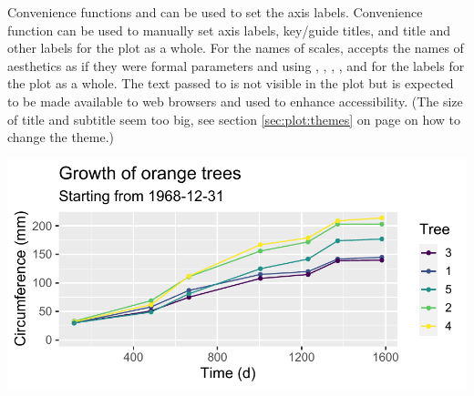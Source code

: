 \documentclass[krantz2]{krantz}\usepackage{knitr}
\begin{document}
Convenience functions  and  can be used to set the axis labels.
Convenience function  can be used to manually set axis labels, key/guide titles, and title and other labels for the plot as a whole. For the names of scales,  accepts the names of aesthetics as if they were formal parameters and using , , , , and  for the labels for the plot as a whole. The text passed to  is not visible in the plot but is expected to be made available to web browsers and used to enhance accessibility. (The size of title and subtitle seem too big, see section \ref{sec:plot:themes} on page \pageref{sec:plot:themes} on how to change the theme.)

\begin{knitrout}\footnotesize
{}\color{fgcolor}\begin{kframe}
\begin{alltt}
 \hlkwb{<-}
  \hlstd{(} 
          \hlstd{=} \hlstd{(}      \hlopt{+}
  \hlstd{()} \hlopt{+}
  \hlstd{()}
\end{alltt}
\end{kframe}
\end{knitrout}

\begin{knitrout}\footnotesize
{}\color{fgcolor}\begin{kframe}
\begin{alltt}
 \hlopt{+}
  \hlstd{(} \hlstd{=} \hlstd{)} \hlopt{+}
  \hlstd{(} \hlstd{=} \hlstd{,}
        \hlstd{=} \hlstd{,}
        \hlstd{=} \hlstd{,}
        \hlstd{=} \hlstd{,}
        \hlstd{=} \hlstd{,}
        \hlstd{=} \hlstd{,}
        \hlstd{=} \hlstd{,}
        \hlstd{=} \hlstd{)}
\end{alltt}
\end{kframe}

{\centering \includegraphics[width=.495\textwidth]{figure/pos-axis-labels-01-1} 

}


\end{knitrout}
\end{document}
